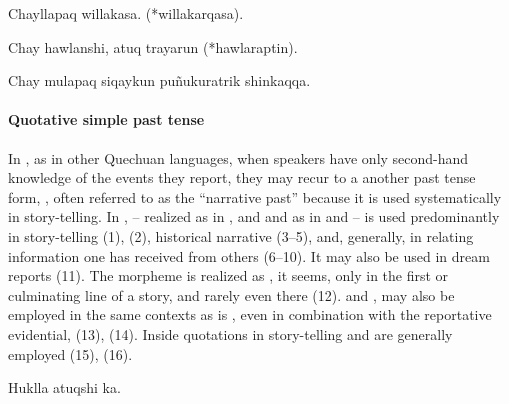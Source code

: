 %
{Chayllapaq willakasa. (*willakarqasa).}%
{}%
{}{}%

%
{Chay hawlanshi, atuq trayarun (*hawlaraptin).}%
{}%
{}{}%

%
{Chay mulapaq siqaykun pu\~nukuratrik shinkaqqa.}%
{}%
{}{}%

\paragraph{Quotative simple past tense }\label{par:QSPT}
In \SYQ{}, as in other Quechuan languages, when speakers have only second-hand knowledge of the events they report, they may recur to a another past tense form, , often referred to as the ``narrative past'' because it is used systematically in story-telling. In \SYQ{},  -- realized as  in \ACH{}, \AMV{} and \SP{} and as  in \CH{} and \LT{} -- is used predominantly in story-telling (1), (2), historical narrative (3--5), and, generally, in relating information one has received from others (6--10). It may also be used in dream reports (11). The morpheme is realized as , it seems, only in the first or culminating line of a story, and rarely even there (12).  and , may also be employed in the same contexts as is , even in combination with the reportative evidential,  (13), (14). Inside quotations in story-telling  and  are generally employed (15), (16).

%
{Huklla atuqshi ka.}%
{}%
{}{}%

